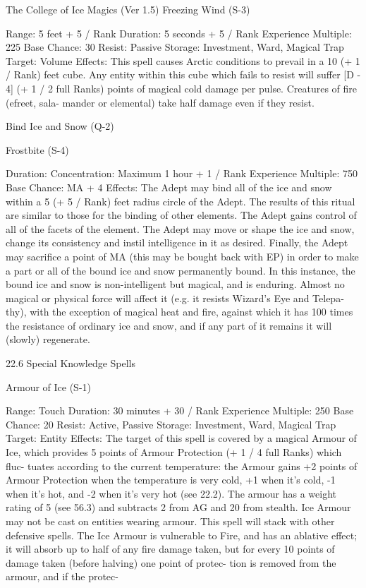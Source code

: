 \begin{Chapter}{The College of Ice Magics (Ver 1.5)}
Freezing Wind (S-3) 

Range: 5 feet + 5 / Rank 
Duration: 5 seconds + 5 / Rank 
Experience Multiple: 225 
Base Chance: 30%
Resist: Passive 
Storage: Investment, Ward, Magical Trap 
Target: Volume 
Effects:  This  spell  causes  Arctic  conditions  to 
prevail  in  a  10  (+  1  /  Rank)  feet  cube.  Any  entity 
within this cube which fails to resist will suffer [D 
-  4]  (+  1  /  2  full  Ranks)  points  of  magical  cold 
damage  per  pulse.  Creatures  of  fire  (efreet,  sala-
mander or elemental) take half damage even if they 
resist. 

Bind Ice and Snow (Q-2) 

Frostbite (S-4) 

Duration:  Concentration:  Maximum  1  hour  +  1  / 
Rank 
Experience Multiple: 750 
Base Chance: MA + 4%
Effects:  The  Adept  may  bind  all  of  the  ice  and 
snow  within  a  5  (+  5  /  Rank)  feet  radius  circle  of 
the  Adept.  The  results  of  this  ritual  are  similar  to 
those for the binding of other elements. The Adept 
gains  control  of  all  of  the  facets  of  the  element. 
The  Adept  may  move  or  shape  the  ice  and  snow, 
change  its  consistency  and  instil  intelligence  in  it 
as desired. Finally, the Adept may sacrifice a point 
of MA (this may be bought back with EP) in order 
to  make  a  part  or  all  of  the  bound  ice  and  snow 
permanently bound. In this instance, the bound ice 
and  snow  is  non-intelligent  but  magical,  and  is 
enduring. Almost no magical or physical force will 
affect  it  (e.g.  it  resists  Wizard’s  Eye  and  Telepa-
thy),  with  the  exception  of  magical  heat  and  fire, 
against  which  it  has  100  times  the  resistance  of 
ordinary ice and snow, and if any part of it remains 
it will (slowly) regenerate. 

22.6 Special Knowledge Spells 

Armour of Ice (S-1) 

Range: Touch 
Duration: 30 minutes + 30 / Rank 
Experience Multiple: 250 
Base Chance: 20%
Resist: Active, Passive 
Storage: Investment, Ward, Magical Trap 
Target: Entity 
Effects:  The  target  of  this  spell  is  covered  by  a 
magical Armour of Ice, which provides 5 points of 
Armour Protection (+ 1 / 4 full Ranks) which fluc-
tuates  according  to  the  current  temperature:  the 
Armour  gains  +2  points  of  Armour  Protection 
when  the  temperature  is  very  cold,  +1  when  it’s 
cold,  -1  when  it’s  hot,  and  -2  when  it’s  very  hot 
(see 22.2). The armour has a weight rating of 5 (see 
56.3) and subtracts 2 from AG and 20 from stealth. 
Ice  Armour  may  not  be  cast  on  entities  wearing 
armour.  This  spell  will  stack  with  other  defensive 
spells.  The  Ice  Armour  is  vulnerable  to  Fire,  and 
has  an  ablative  effect;  it  will  absorb  up  to  half  of 
any  fire  damage  taken,  but  for  every  10  points  of 
damage taken (before halving) one point of protec-
tion is removed from the armour, and if the protec-


\end{Chapter}
